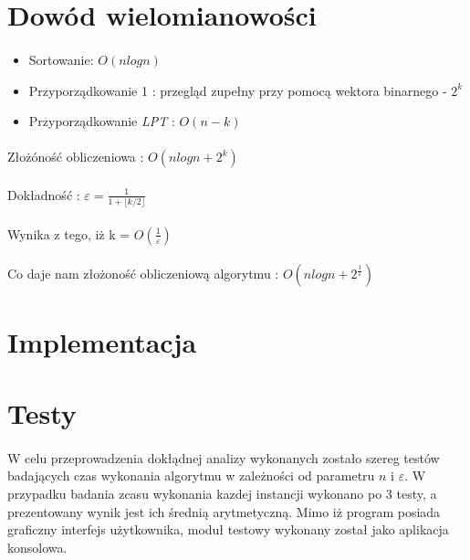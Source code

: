 \documentclass[wide,a4paper,titlepage,12pt] {article}
\begin{document}
\section{Dowód wielomianowości}
\paragraph{}
\begin{itemize}
  \item Sortowanie: $O(nlogn)$
  \item Przyporządkowanie 1 : przegląd zupełny przy pomocą wektora binarnego - $2^k$
  \item Przyporządkowanie \textit{LPT} : $O(n-k)$
\end{itemize}

\paragraph{}
Złożóność obliczeniowa : $O(nlogn + 2^k)$
\paragraph{}
Dokładność : 
$\varepsilon = \frac{1}{1+\lfloor k/2 \rfloor}$
\paragraph{}
 Wynika z tego, iż k = $O(\frac{1}{\varepsilon})$
\paragraph{}
Co daje nam złożoność obliczeniową algorytmu : $O(nlogn + 2^{\frac{1}{\varepsilon}})$

\section{Implementacja}
\paragraph{}

\section{Testy}
\paragraph{}
W celu przeprowadzenia dokłądnej analizy wykonanych zostało szereg testów badających czas wykonania algorytmu w zależności od parametru $n$ i $\varepsilon$. W przypadku badania zcasu wykonania kazdej instancji wykonano po 3 testy, a prezentowany wynik jest ich średnią arytmetyczną. Mimo iż program posiada graficzny interfejs użytkownika, moduł testowy wykonany został jako aplikacja konsolowa.
\end{document}
